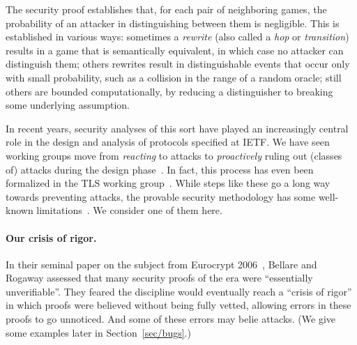 \documentclass{article}
\begin{document}
The security proof establishes that, for each pair of neighboring games, the
probability of an attacker in distinguishing between them is negligible.
%
This is established in various ways:
%
sometimes a \emph{rewrite} (also called a \emph{hop} or \emph{transition})
results in a game that is semantically equivalent, in which case no attacker
can distinguish them;
%
others rewrites result in distinguishable events that occur only with small
probability, such as a collision in the range of a random oracle;
%
still others are bounded computationally, by reducing a distinguisher to
breaking some underlying assumption.

In recent years, security analyses of this sort have played an increasingly
central role in the design and analysis of protocols specified at IETF. We have
seen working groups move from \emph{reacting} to attacks to \emph{proactively}
ruling out (classes of) attacks during the design phase~\cite{KT16}.
%
In fact, this process has even been formalized in the TLS working
group~\cite{tls13-formal-analysis-triage-panel}.
%
While steps like these go a long way towards preventing attacks, the provable
security methodology has some well-known limitations~\cite{Ber19}.
%
We consider one of them here.

\paragraph{Our crisis of rigor.}
%
In their seminal paper on the subject from Eurocrypt 2006~\cite{BR06}, Bellare
and Rogaway assessed that many security proofs of the era were ``essentially
unverifiable''. They feared the discipline would eventually reach a ``crisis of
rigor'' in which proofs were believed without being fully vetted, allowing
errors in these proofs to go unnoticed. And some of these errors may belie
attacks. (We give some examples later in Section~\ref{sec/bugs}.)
%
\end{document}
